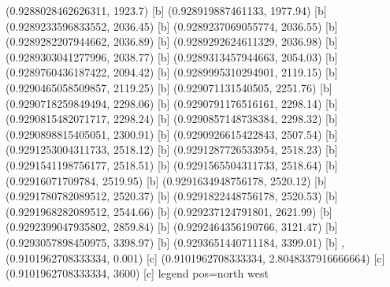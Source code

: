 {{{(0.9288028462626311, 1923.7) [b] 
(0.928919887461133, 1977.94) [b] 
(0.9289233596833552, 2036.45) [b] 
(0.9289237069055774, 2036.55) [b] 
(0.9289282207944662, 2036.89) [b] 
(0.9289292624611329, 2036.98) [b] 
(0.9289303041277996, 2038.77) [b] 
(0.9289313457944663, 2054.03) [b] 
(0.9289760436187422, 2094.42) [b] 
(0.9289995310294901, 2119.15) [b] 
(0.9290465058509857, 2119.25) [b] 
(0.929071131540505, 2251.76) [b] 
(0.9290718259849494, 2298.06) [b] 
(0.9290791176516161, 2298.14) [b] 
(0.9290815482071717, 2298.24) [b] 
(0.9290857148738384, 2298.32) [b] 
(0.9290898815405051, 2300.91) [b] 
(0.9290926615422843, 2507.54) [b] 
(0.9291253004311733, 2518.12) [b] 
(0.9291287726533954, 2518.23) [b] 
(0.9291541198756177, 2518.51) [b] 
(0.9291565504311733, 2518.64) [b] 
(0.92916071709784, 2519.95) [b] 
(0.9291634948756178, 2520.12) [b] 
(0.9291780782089512, 2520.37) [b] 
(0.9291822448756178, 2520.53) [b] 
(0.9291968282089512, 2544.66) [b] 
(0.929237124791801, 2621.99) [b] 
(0.9292399047935802, 2859.84) [b] 
(0.9292464356190766, 3121.47) [b] 
(0.9293057898450975, 3398.97) [b] 
(0.9293651440711184, 3399.01) [b] 
},{(0.9101962708333334, 0.001) [c] 
(0.9101962708333334, 2.8048337916666664) [c] 
(0.9101962708333334, 3600) [c] 
}}}{legend pos=north west}